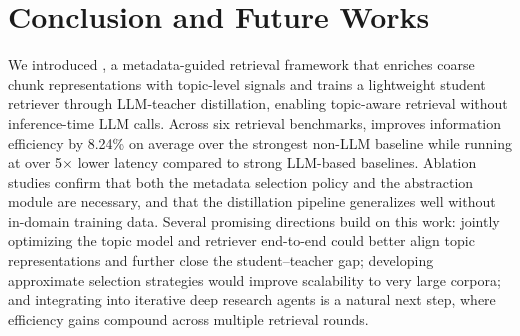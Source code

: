\section{Conclusion and Future Works}
\label{sec:conclusion}

We introduced \name{}, a metadata-guided retrieval framework that enriches coarse chunk representations with topic-level signals and trains a lightweight student retriever through LLM-teacher distillation, enabling topic-aware retrieval without inference-time LLM calls. Across six retrieval benchmarks, \name{} improves information efficiency by 8.24\% on average over the strongest non-LLM baseline while running at over 5$\times$ lower latency compared to strong LLM-based baselines. Ablation studies confirm that both the metadata selection policy and the abstraction module are necessary, and that the distillation pipeline generalizes well without in-domain training data. Several promising directions build on this work: jointly optimizing the topic model and retriever end-to-end could better align topic representations and further close the student--teacher gap; developing approximate selection strategies would improve scalability to very large corpora; and integrating \name{} into iterative deep research agents is a natural next step, where efficiency gains compound across multiple retrieval rounds.